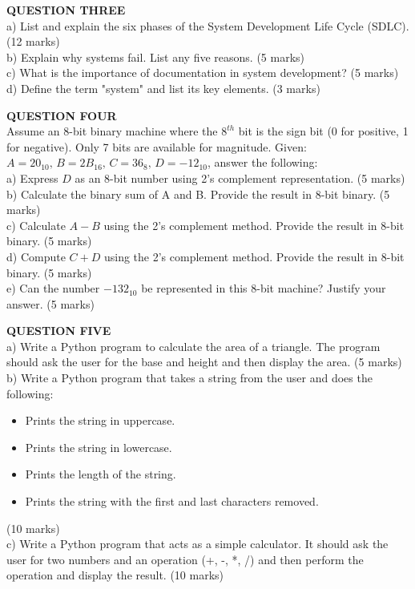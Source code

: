 \documentclass[12pt]{article}
\begin{document}
\vspace{0.5cm}

\noindent
\textbf{QUESTION THREE}\\
a) List and explain the six phases of the System Development Life Cycle (SDLC). \hfill (12 marks)\\
b) Explain why systems fail. List any five reasons. \hfill (5 marks)\\
c) What is the importance of documentation in system development? \hfill (5 marks)\\
d) Define the term "system" and list its key elements. \hfill (3 marks)\\

\vspace{0.5cm}

\noindent
\textbf{QUESTION FOUR}\\
Assume an 8-bit binary machine where the \( 8^{th} \) bit is the sign bit (0 for positive, 1 for negative). Only 7 bits are available for magnitude. Given: \( A = 20_{10}, \, B = 2B_{16}, \, C = 36_{8}, \, D = -12_{10} \), answer the following:\\
a) Express \( D \) as an 8-bit number using 2’s complement representation. \hfill (5 marks)\\
b) Calculate the binary sum of A and B. Provide the result in 8-bit binary. \hfill (5 marks)\\
c) Calculate \( A - B \) using the 2’s complement method. Provide the result in 8-bit binary. \hfill (5 marks)\\
d) Compute \( C + D \) using the 2’s complement method. Provide the result in 8-bit binary. \hfill (5 marks)\\
e) Can the number \( -132_{10} \) be represented in this 8-bit machine? Justify your answer. \hfill (5 marks)\\

\vspace{0.5cm}

\noindent
\textbf{QUESTION FIVE}\\
a) Write a Python program to calculate the area of a triangle. The program should ask the user for the base and height and then display the area. \hfill (5 marks)\\
b) Write a Python program that takes a string from the user and does the following:
    \begin{itemize}
        \item Prints the string in uppercase.
        \item Prints the string in lowercase.
        \item Prints the length of the string.
        \item Prints the string with the first and last characters removed.
    \end{itemize}
    \hfill (10 marks)\\
c) Write a Python program that acts as a simple calculator. It should ask the user for two numbers and an operation (+, -, *, /) and then perform the operation and display the result. \hfill (10 marks)\\
\end{document}
